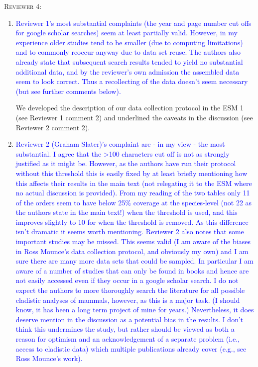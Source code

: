 \documentclass[12pt,letterpaper]{article}
\renewcommand{\section}[1]{%
\bigskip
\begin{center}
\begin{Large}
\normalfont\scshape #1
\medskip
\end{Large}
\end{center}}
\begin{document}

\section{Reviewer 4:}
\begin{enumerate}
\item{\textcolor{blue}{Reviewer 1's most substantial complaints (the year and page number cut offs for google scholar searches) seem at least partially valid.
However, in my experience older studies tend to be smaller (due to computing limitations) and to commonly reoccur anyway due to data set reuse.
The authors also already state that subsequent search results tended to yield no substantial additional data, and by the reviewer's own admission the assembled data seem to look correct.
Thus a recollecting of the data doesn't seem necessary (but see further comments below).}}

We developed the description of our data collection protocol in the ESM 1 (see Reviewer 1 comment 2) and underlined the caveats in the discussion (see Reviewer 2 comment 2).

\item{\textcolor{blue}{Reviewer 2 (Graham Slater)'s complaint are - in my view - the most substantial.
I agree that the >100 characters cut off is not as strongly justified as it might be.
However, as the authors have run their protocol without this threshold this is easily fixed by at least briefly mentioning how this affects their results in the main text (not relegating it to the ESM where no actual discussion is provided).
From my reading of the two tables only 11 of the orders seem to have below 25\% coverage at the species-level (not 22 as the authors state in the main text!) when the threshold is used, and this improves slightly to 10 for when the threshold is removed.
As this difference isn't dramatic it seems worth mentioning.
Reviewer 2 also notes that some important studies may be missed.
This seems valid (I am aware of the biases in Ross Mounce's data collection protocol, and obviously my own) and I am sure there are many more data sets that could be sampled.
In particular I am aware of a number of studies that can only be found in books and hence are not easily accessed even if they occur in a google scholar search.
I do not expect the authors to more thoroughly search the literature for all possible cladistic analyses of mammals, however, as this is a major task.
(I should know, it has been a long term project of mine for years.)
Nevertheless, it does deserve mention in the discussion as a potential bias in the results.
I don't think this undermines the study, but rather should be viewed as both a reason for optimism and an acknowledgement of a separate problem (i.e., access to cladistic data) which multiple publications already cover (e.g., see Ross Mounce's work).}}


\end{enumerate}
\end{document}
